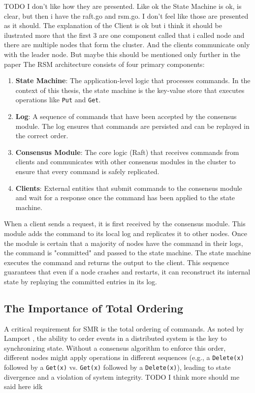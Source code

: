 TODO I don't like how they are presented. Like ok the State Machine is ok, is clear, but then i have the raft.go and rsm.go. I don't feel like those are presented as it should. The explanation of the Client is ok but i think it should be ilustrated more that the first 3 are one component called that i called node and there are multiple nodes that form the cluster. And the clients communicate only with the leader node. But maybe this should be mentioned only further in the paper
The RSM architecture consists of four primary components:
\begin{enumerate}
    \item \textbf{State Machine}: The application-level logic that processes commands. In the context of this thesis, the state machine is the key-value store that executes operations like \texttt{Put} and \texttt{Get}.
    \item \textbf{Log}: A sequence of commands that have been accepted by the consensus module. The log ensures that commands are persisted and can be replayed in the correct order.
    \item \textbf{Consensus Module}: The core logic (Raft) that receives commands from clients and communicates with other consensus modules in the cluster to ensure that every command is safely replicated.
    \item \textbf{Clients}: External entities that submit commands to the consensus module and wait for a response once the command has been applied to the state machine.
\end{enumerate}

When a client sends a request, it is first received by the consensus module. This module adds the command to its local log and replicates it to other nodes. Once the module is certain that a majority of nodes have the command in their logs, the command is "committed" and passed to the state machine. The state machine executes the command and returns the output to the client. This sequence guarantees that even if a node crashes and restarts, it can reconstruct its internal state by replaying the committed entries in its log.

\subsection{The Importance of Total Ordering}
A critical requirement for SMR is the total ordering of commands. As noted by Lamport \cite{Lamport1978}, the ability to order events in a distributed system is the key to synchronizing state. Without a consensus algorithm to enforce this order, different nodes might apply operations in different sequences (e.g., a \texttt{Delete(x)} followed by a \texttt{Get(x)} vs. \texttt{Get(x)} followed by a \texttt{Delete(x)}), leading to state divergence and a violation of system integrity.
TODO I think more should me said here idk

